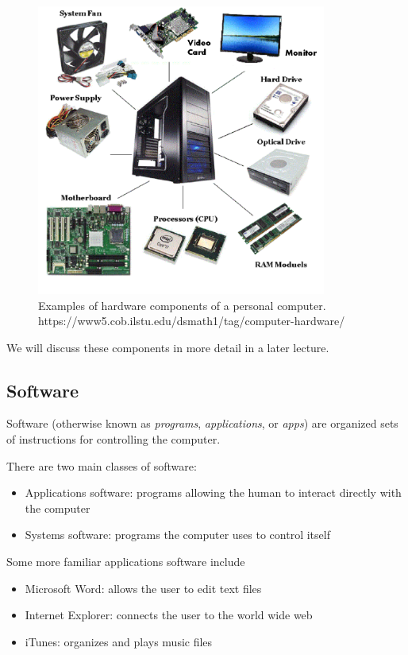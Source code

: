 \begin{figure}
	\centering
	\includegraphics[width=0.85\textwidth]{images/hardware.png}
	\caption{Examples of hardware components of a personal computer. https://www5.cob.ilstu.edu/dsmath1/tag/computer-hardware/}
	\label{fig:hardware}
\end{figure}

We will discuss these components in more detail in a later lecture. 

\subsection{Software}

Software (otherwise known as \textit{programs}, \textit{applications}, or \textit{apps}) are organized sets of instructions for controlling the computer.

There are two main classes of software:

\begin{itemize}
	\item Applications software: programs allowing the human to interact directly with the computer
	\item Systems software: programs the computer uses to control itself
\end{itemize}

Some more familiar applications software include

\begin{itemize}
	\item Microsoft Word: allows the user to edit text files
	\item Internet Explorer: connects the user to the world wide web
	\item iTunes: organizes and plays music files
\end{itemize}

